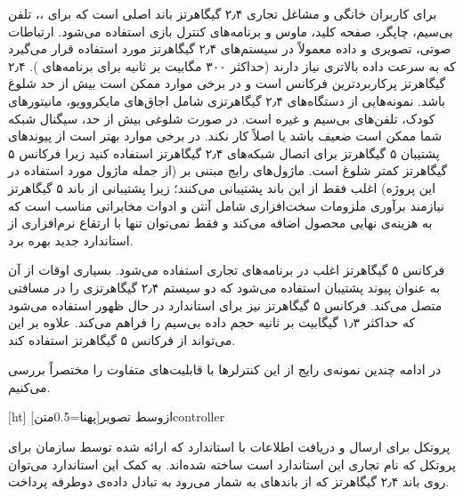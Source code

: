 برای کاربران خانگی و مشاغل تجاری ۲٫۴ گیگاهرتز باند اصلی است که برای ،، تلفن بی‌سیم، چاپگر، صفحه کلید، ماوس و برنامه‌های کنترل بازی استفاده می‌شود. ارتباطات صوتی، تصویری و داده معمولاً در سیستم‌های ۲٫۴ گیگاهرتز مورد استفاده قرار می‌گیرد که به سرعت داده بالاتری نیاز دارند (حداکثر ۳۰۰ مگابیت بر ثانیه برای برنامه‌های ). ۲٫۴ گیگاهرتز پرکاربردترین فرکانس است و در برخی موارد ممکن است بیش از حد شلوغ باشد. نمونه‌هایی از دستگاه‌های ۲٫۴ گیگاهرتزی شامل اجاق‌های مایکروویو، مانیتورهای کودک، تلفن‌های بی‌سیم و غیره است. در صورت شلوغی بیش از حد، سیگنال شبکه  شما ممکن است ضعیف باشد یا اصلاً کار نکند. در برخی موارد بهتر است از پیوندهای پشتیبان ۵ گیگاهرتز برای اتصال شبکه‌های  ۲٫۴ گیگاهرتز استفاده کنید زیرا فرکانس ۵ گیگاهرتز کمتر شلوغ است. ماژول‌های رایج مبتنی بر  (از جمله ماژول مورد استفاده در این پروژه) اغلب فقط از این باند پشتیبانی می‌کنند؛ زیرا پشتیبانی از باند ۵ گیگاهرتز نیازمند برآوری ملزومات سخت‌افزاری شامل آنتن و ادوات مخابراتی مناسب است که به هزینه‌ی نهایی محصول اضافه می‌کند و فقط نمی‌توان تنها با ارتقاع نرم‌افزاری از استاندارد جدید  بهره برد.
 
فرکانس ۵ گیگاهرتز اغلب در برنامه‌های تجاری  استفاده می‌شود. بسیاری اوقات از آن به عنوان پیوند پشتیبان استفاده می‌شود که دو سیستم ۲٫۴ گیگاهرتزی را در مسافتی متصل می‌کند. فرکانس ۵ گیگاهرتز نیز برای استاندارد در حال ظهور  استفاده می‌شود که حداکثر ۱٫۳ گیگابیت بر ثانیه حجم داده بی‌سیم را فراهم می‌کند. علاوه بر این  می‌تواند از فرکانس ۵ گیگاهرتز استفاده کند. 

در ادامه چندین نمونه‌ی رایج از این کنترلرها با قابلیت‌های متفاوت را مختصراً بررسی می‌کنیم.


[ht]
‌ازوسط
‌تصویر[پهنا=0.5‌متن]{controller}

پروتکل  برای ارسال و دریافت اطلاعات با استاندارد  که ارائه شده توسط سازمان  برای پروتکل  که نام تجاری این استاندارد است ساخته شده‌اند. به کمک این استاندارد می‌توان روی باند ۲٫۴ گیگاهرتز که از باندهای  به شمار می‌رود به تبادل داده‌ی دوطرفه پرداخت.

